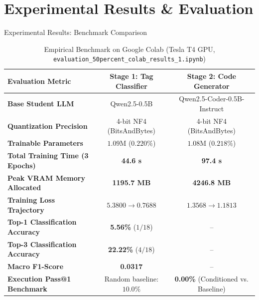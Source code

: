 \documentclass[aspectratio=169,10pt]{beamer}
\begin{document}
\section{Experimental Results \& Evaluation}

\begin{frame}{Experimental Results: Benchmark Comparison}
  \begin{table}[h]
    \centering
    \small
    \renewcommand{\arraystretch}{1.12}
    \begin{tabular}{lcc}
      \toprule
      \textbf{Evaluation Metric} & \textbf{Stage 1: Tag Classifier} & \textbf{Stage 2: Code Generator} \\
      \midrule
      \textbf{Base Student LLM} & Qwen2.5-0.5B & Qwen2.5-Coder-0.5B-Instruct \\
      \textbf{Quantization Precision} & 4-bit NF4 (BitsAndBytes) & 4-bit NF4 (BitsAndBytes) \\
      \textbf{Trainable Parameters} & $1.09\text{M}$ ($0.220\%$) & $1.08\text{M}$ ($0.218\%$) \\
      \rowcolor{blue!6}
      \textbf{Total Training Time (3 Epochs)} & \textbf{44.6 s} & \textbf{97.4 s} \\
      \rowcolor{blue!6}
      \textbf{Peak VRAM Memory Allocated} & \textbf{1195.7 MB} & \textbf{4246.8 MB} \\
      \midrule
      \textbf{Training Loss Trajectory} & $5.3800 \to 0.7688$ & $1.3568 \to 1.1813$ \\
      \textbf{Top-1 Classification Accuracy} & \textbf{5.56\%} ($1/18$) & -- \\
      \textbf{Top-3 Classification Accuracy} & \textbf{22.22\%} ($4/18$) & -- \\
      \textbf{Macro F1-Score} & \textbf{0.0317} & -- \\
      \textbf{Execution Pass@1 Benchmark} & Random baseline: $10.0\%$ & \textbf{0.00\%} (Conditioned vs. Baseline) \\
      \bottomrule
    \end{tabular}
    \caption{Empirical Benchmark on Google Colab (Tesla T4 GPU, \texttt{evaluation\_50percent\_colab\_results\_1.ipynb})}
  \end{table}
\end{frame}
\end{document}
